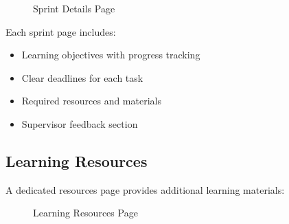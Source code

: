 \begin{figure}[H]
    \centering
    \caption{Sprint Details Page}
    \label{fig:sprint_details}
\end{figure}

Each sprint page includes:
\begin{itemize}
    \item Learning objectives with progress tracking
    \item Clear deadlines for each task
    \item Required resources and materials
    \item Supervisor feedback section
\end{itemize}

\subsection{Learning Resources}
\noindent
A dedicated resources page provides additional learning materials:

\begin{figure}[H]
    \centering
    \caption{Learning Resources Page}
    \label{fig:resources}
\end{figure}

